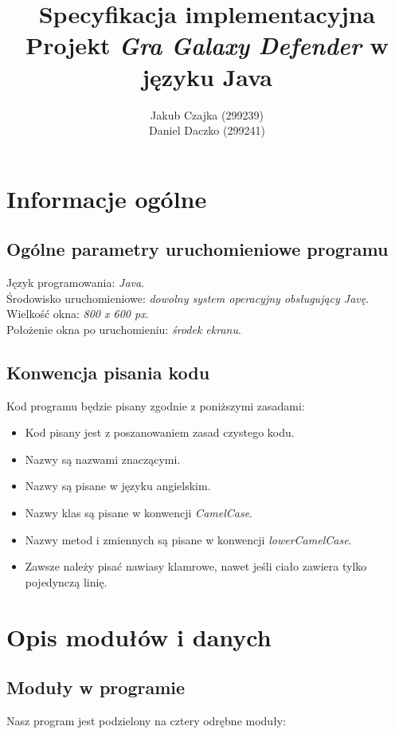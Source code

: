 \documentclass[a4paper]{article}
\title{Specyfikacja implementacyjna \\ Projekt \textit{Gra Galaxy Defender} w języku Java}
\author{Jakub Czajka (299239) \\ Daniel Daczko (299241)}
\begin{document}
\maketitle
\thispagestyle{empty}
\tableofcontents

\newpage

\section{Informacje ogólne}
\subsection{Ogólne parametry uruchomieniowe programu}
Język programowania: \textit{Java}.\medskip\\
Środowisko uruchomieniowe: \textit{dowolny system operacyjny obsługujący Javę}.\medskip\\
Wielkość okna: \textit{800 x 600 px}.\medskip\\
Położenie okna po uruchomieniu: \textit{środek ekranu}.

\subsection{Konwencja pisania kodu}
Kod programu będzie pisany zgodnie z poniższymi zasadami:
\begin{itemize}
    \item Kod pisany jest z poszanowaniem zasad czystego kodu.
    \item Nazwy są nazwami znaczącymi.
    \item Nazwy są pisane w języku angielskim.
    \item Nazwy klas są pisane w konwencji \textit{CamelCase}.
    \item Nazwy metod i zmiennych są pisane w konwencji \textit{lowerCamelCase}.
    \item Zawsze należy pisać nawiasy klamrowe, nawet jeśli ciało zawiera tylko pojedynczą linię.
\end{itemize}

\section{Opis modułów i danych}
\subsection{Moduły w programie}
Nasz program jest podzielony na cztery odrębne moduły:
\end{document}
